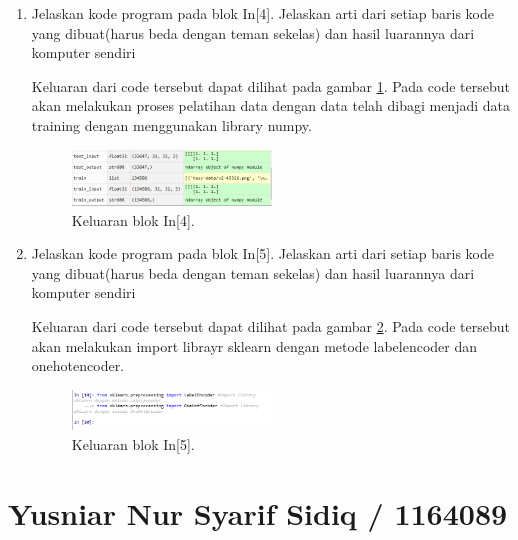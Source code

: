 \begin{enumerate}
\item Jelaskan kode program pada blok In[4]. Jelaskan arti dari setiap baris kode yang dibuat(harus beda dengan teman sekelas) dan hasil luarannya dari komputer sendiri \par

Keluaran dari code tersebut dapat dilihat pada gambar \ref{math4}. Pada code tersebut akan melakukan proses pelatihan data dengan data telah dibagi menjadi data training dengan menggunakan library numpy.
		\begin{figure}[!htbp]
		\centerline{\includegraphics[width=0.5\textwidth]{figures/im/math4.png}}
		\caption{Keluaran blok In[4].}
		\label{math4}
		\end{figure}

\item Jelaskan kode program pada blok In[5]. Jelaskan arti dari setiap baris kode yang dibuat(harus beda dengan teman sekelas) dan hasil luarannya dari komputer sendiri \par

Keluaran dari code tersebut dapat dilihat pada gambar \ref{math5}. Pada code tersebut akan melakukan import librayr sklearn dengan metode labelencoder dan onehotencoder.
		\begin{figure}[!htbp]
		\centerline{\includegraphics[width=0.5\textwidth]{figures/im/math5.png}}
		\caption{Keluaran blok In[5].}
		\label{math5}
		\end{figure}
\end{enumerate}



\section{Yusniar Nur Syarif Sidiq / 1164089}
